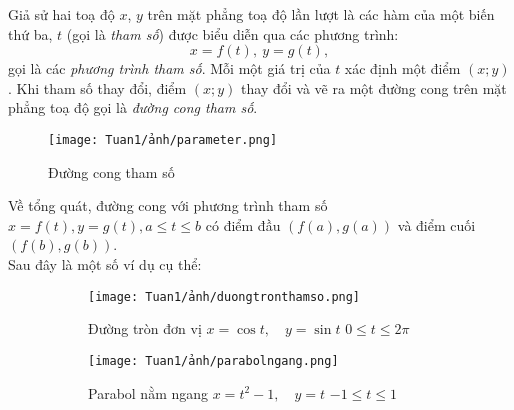 \begin{definition}
    Giả sử hai toạ độ $x$, $y$ trên mặt phẳng toạ độ lần lượt là các hàm của một biến thứ ba, $t$ (gọi là \emph{tham số}) được biểu diễn qua các phương trình:
     \begin{equation*}   x=f(t),\ y=g(t),
\end{equation*}
    gọi là các \emph{phương trình tham số}. Mỗi một giá trị của $t$ xác định một điểm $(x;y)$. Khi tham số thay đổi, điểm $(x;y)$ thay đổi và vẽ ra một đường cong trên mặt phẳng toạ độ gọi là \emph{đường cong tham số}.
\end{definition}


\newpage

\begin{figure}[!htbp]
    \centering
    \texttt{[image: Tuan1/ảnh/parameter.png]}
    \caption{Đường cong tham số}\label{fig:phuongtrinhthamso}
\end{figure}    
\vspace{-0.5em}
Về tổng quát, đường cong với phương trình tham số $x=f(t), y=g(t), a\leq t\leq b$ có điểm đầu $(f(a),g(a))$ và điểm cuối $(f(b),g(b))$.\\ Sau đây là một số ví dụ cụ thể:
\vspace{-1.75em}
\begin{figure}[H]
    \centering
    \begin{subfigure}{0.45\textwidth}
        \texttt{[image: Tuan1/ảnh/duongtronthamso.png]}
        \caption{ Đường tròn đơn vị \newline\hspace*{1em} \(x=\cos t,\quad y=\sin t\)\newline \hspace*{1em} \(0\leq t\leq 2\pi\)}
    \end{subfigure}
    \hspace{\fill}
    \begin{subfigure}{0.45\textwidth}
        \texttt{[image: Tuan1/ảnh/parabolngang.png]}
        \caption{Parabol nằm ngang \newline\hspace*{1em}\(x=t^2 -1,\quad y=t\)\newline\hspace*{1em} \(-1\leq t\leq 1\)}
    \end{subfigure}
    \caption{}
\end{figure}

